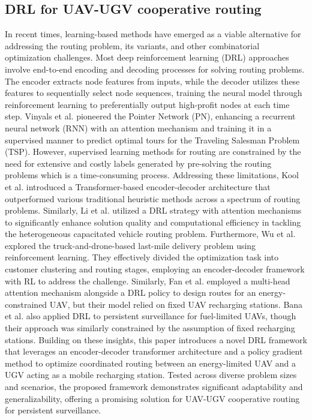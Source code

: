 \subsection{DRL for UAV-UGV cooperative routing}

In recent times, learning-based methods have emerged as a viable alternative for addressing the routing problem, its variants, and other combinatorial optimization challenges. Most deep reinforcement learning (DRL) approaches involve end-to-end encoding and decoding processes for solving routing problems. The encoder extracts node features from inputs, while the decoder utilizes these features to sequentially select node sequences, training the neural model through reinforcement learning to preferentially output high-profit nodes at each time step. Vinyals et al. \cite{vinyals2015pointer} pioneered the Pointer Network (PN), enhancing a recurrent neural network (RNN) with an attention mechanism \cite{bahdanau2014neural} and training it in a supervised manner to predict optimal tours for the Traveling Salesman Problem (TSP). However, supervised learning methods for routing are constrained by the need for extensive and costly labels generated by pre-solving the routing problems which is a time-consuming process. Addressing these limitations, Kool et al. \cite{kool2018attention} introduced a Transformer-based encoder-decoder architecture that outperformed various traditional heuristic methods across a spectrum of routing problems. Similarly, Li et al. \cite{li2021deep} utilized a DRL strategy with attention mechanisms to significantly enhance solution quality and computational efficiency in tackling the heterogeneous capacitated vehicle routing problem. Furthermore, Wu et al. \cite{wu2021reinforcement} explored the truck-and-drone-based last-mile delivery problem using reinforcement learning. They effectively divided the optimization task into customer clustering and routing stages, employing an encoder-decoder framework with RL to address the challenge. Similarly, Fan et al. \cite{fan2022deep} employed a multi-head attention mechanism alongside a DRL policy to design routes for an energy-constrained UAV, but their model relied on fixed UAV recharging stations. Bana et al. \cite{bana2024deep} also applied DRL to persistent surveillance for fuel-limited UAVs, though their approach was similarly constrained by the assumption of fixed recharging stations. Building on these insights, this paper introduces a novel DRL framework that leverages an encoder-decoder transformer architecture and a policy gradient method to optimize coordinated routing between an energy-limited UAV and a UGV acting as a mobile recharging station. Tested across diverse problem sizes and scenarios, the proposed framework demonstrates significant adaptability and generalizability, offering a promising solution for UAV-UGV cooperative routing for persistent surveillance.